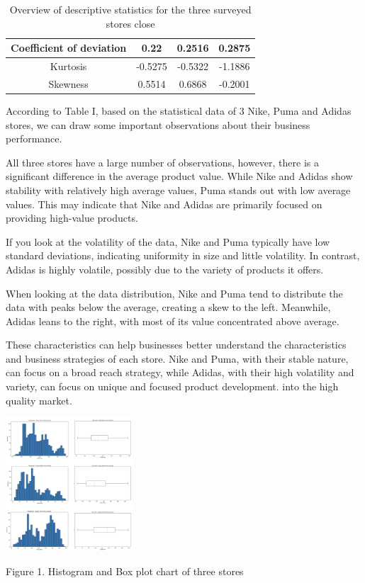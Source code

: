 \documentclass[conference]{IEEEtran}
\begin{document}
{\begin{table}[htbp]
\begin{tabular}{|c|c|c|c|}
 Coefficient of deviation& 0.22 & 0.2516& 0.2875\\ \hline 

 Kurtosis & -0.5275& -0.5322& -1.1886\\ \hline 

 Skewness & 0.5514& 0.6868& -0.2001\\ \hline

\end{tabular}
\caption{Overview of descriptive statistics for the three surveyed stores close}
\end{table}
According to Table I, based on the statistical data of 3 Nike, Puma and Adidas stores, we can draw some important observations about their business performance.

All three stores have a large number of observations, however, there is a significant difference in the average product value. While Nike and Adidas show stability with relatively high average values, Puma stands out with low average values. This may indicate that Nike and Adidas are primarily focused on providing high-value products.

If you look at the volatility of the data, Nike and Puma typically have low standard deviations, indicating uniformity in size and little volatility. In contrast, Adidas is highly volatile, possibly due to the variety of products it offers.

When looking at the data distribution, Nike and Puma tend to distribute the data with peaks below the average, creating a skew to the left. Meanwhile, Adidas leans to the right, with most of its value concentrated above average.

These characteristics can help businesses better understand the characteristics and business strategies of each store. Nike and Puma, with their stable nature, can focus on a broad reach strategy, while Adidas, with their high volatility and variety, can focus on unique and focused product development. into the high quality market.

\begin{center}
\includegraphics[max width=\linewidth, height = 5cm]{Plot.png}
\end{center}
Figure 1. Histogram and Box plot chart of three stores
}
\end{document}
